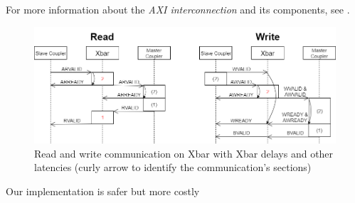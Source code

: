 For more information about the \textit{AXI interconnection} and its components, see \cite{AXIInterconnectGuide}.

\begin{figure}[!hb]
  \includegraphics[width=\textwidth]{./../../img/Images/Read_Write_xbar}
  \caption{Read and write communication on Xbar with {\color{Red}Xbar delays} and other latencies (curly arrow to identify the communication's sections)}
  \label{RWXbar}
\end{figure}



{}
Our implementation is safer but more costly
